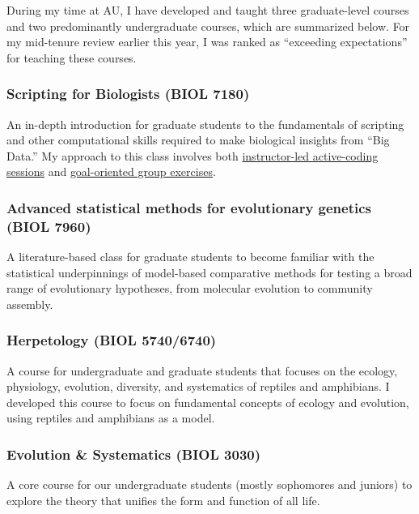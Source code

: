 During my time at AU,
I have developed and taught three graduate-level courses
and two predominantly undergraduate courses,
which are summarized below.
For my mid-tenure review earlier this year, I was ranked as ``exceeding
expectations'' for teaching these courses.

\subsubsection*{Scripting for Biologists (BIOL 7180)}
An in-depth introduction for graduate students to the fundamentals of scripting
and other computational skills required to make biological insights from ``Big
Data.''
My approach to this class involves both
\href{http://phyletica.org/slides/python/intro/}{instructor-led active-coding
    sessions}
and
\href{https://github.com/joaks1/python-translation-project}{goal-oriented group
    exercises}.

\subsubsection*{Advanced statistical methods for evolutionary genetics (BIOL 7960)}
A literature-based class for graduate students to become familiar with the
statistical underpinnings of model-based comparative methods for testing a
broad range of evolutionary hypotheses, from molecular evolution to community
assembly.

\subsubsection*{Herpetology (BIOL 5740/6740)}
A course for undergraduate and graduate students that focuses on the ecology,
physiology, evolution, diversity, and systematics of reptiles and amphibians.
I developed this course to focus on fundamental concepts of ecology and
evolution, using reptiles and amphibians as a model.

\subsubsection*{Evolution \& Systematics (BIOL 3030)}
A core course for our undergraduate students (mostly sophomores and juniors) to
explore the theory that unifies the form and function of all life.

